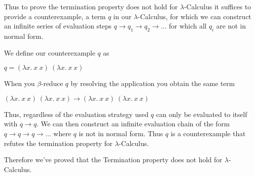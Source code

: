 \documentclass[12pt, fleqn]{article}
\begin{document}
Thus to prove the termination property does not hold for $\lambda$-Calculus it suffices to provide a counterexample, a term $q$
in our $\lambda$-Calculus, for which we can construct an infinite series of evaluation steps $q \rightarrow q_1 \rightarrow q_2 \rightarrow ...$
for which all $q_i$ are not in normal form.

We define our counterexample $q$ as
\begin{center}
    $q = (\lambda x.\:x\:x)\:(\lambda x.\:x\:x)$
\end{center}
When you $\beta$-reduce $q$ by resolving the application you obtain the same term
\begin{center}
    $(\lambda x.\:x\:x)\:(\lambda x.\:x\:x) \rightarrow (\lambda x.\:x\:x)\:(\lambda x.\:x\:x)$
\end{center}
Thus, regardless of the evaluation strategy used $q$ can only be evaluated to itself with $q \rightarrow q$. We can
then construct an infinite evaluation chain of the form $q \rightarrow q \rightarrow q \rightarrow ...$ where $q$ is not
in normal form. Thus $q$ is a counterexample that refutes the termination property for $\lambda$-Calculus.

Therefore we've proved that the Termination property does not hold for $\lambda$-Calculus.
\end{document}
